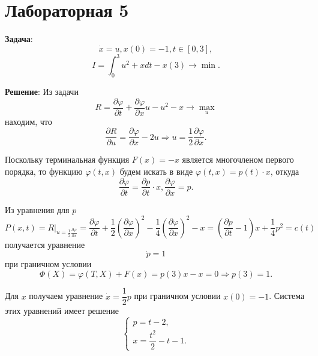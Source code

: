 \documentclass[a4paper, 12pt]{article}
\newcommand{\df}[2]{\frac{\partial #1}{\partial #2}}
\begin{document}
\section{Лабораторная 5}
{\bf Задача}:
\begin{equation}
    \dot x = u , x(0)=-1, t \in [0,3],
\end{equation}
\begin{equation}
    I=\int_0^3 u^2+x dt - x(3) \rightarrow \min.
\end{equation}

{\bf Решение}:
Из задачи
\begin{equation}
    R= \df{\varphi}{t}+\df{\varphi}{x} u - u^2-x \rightarrow \max_u
\end{equation}
находим, что
\begin{equation}
    \df{R}{u}=\df{\varphi}{x} - 2u \Rightarrow u= \dfrac{1}{2} \df{\varphi}{x}.
\end{equation}

Поскольку терминальная функция $F(x)=-x$ является многочленом первого порядка, то функцию $\varphi(t,x)$ будем искать в виде $\varphi(t,x)=p(t)\cdot x$, откуда
\begin{equation}
    \df{\varphi}{t}= \df{p}{t} \cdot x, \df{\varphi}{x}=p. 
\end{equation}

Из уравнения для $p$
\begin{equation}
    P(x,t)=R|_{u=\frac{1}{2} \df{\varphi}{x}}=\df{\varphi}{t}+\dfrac{1}{2} \left(\df{\varphi}{x} \right)^2-\dfrac{1}{4} \left(\df{\varphi}{x} \right)^2-x=\left(\df{p}{t}-1 \right)x +\dfrac{1}{4}p^2=c(t)
\end{equation}
получается уравнение
\begin{equation}
    \dot p=1
\end{equation}
при граничном условии
\begin{equation}
    \Phi (X) = \varphi (T,X)+F(x)=p(3) x-x=0 \Rightarrow p(3)=1.
\end{equation}

Для $x$ получаем уравнение $\dot x = \dfrac{1}{2} p$ при граничном условии $x(0)=-1$. Система этих уравнений имеет решение
\begin{equation}
    \begin{cases}
        p=t-2,\\
        x=\dfrac{t^2}{2}-t-1.
    \end{cases}
\end{equation}
\end{document}
